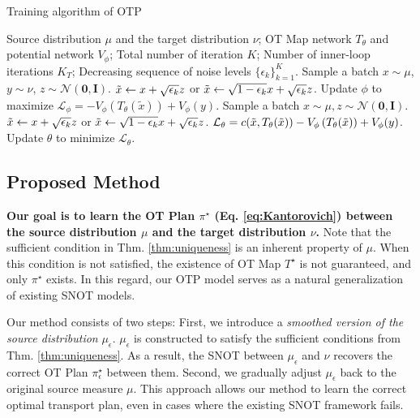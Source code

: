 \begin{algorithm}[t]
\caption{Training algorithm of OTP}
\begin{algorithmic}[1]
\REQUIRE Source distribution $\mu$ and the target distribution $\nu$; OT Map network $T_\theta$ and potential network $V_\phi$; Total number of iteration $K$; Number of inner-loop iterations $K_T$; Decreasing sequence of noise levels $\{\epsilon_k \}^K_{k=1}$.
    \STATE Sample a batch $x\sim \mu$, $y\sim \nu$, $z \sim \mathcal{N}(\mathbf{0}, \mathbf{I})$.
    \STATE $\Tilde{x} \leftarrow x + \sqrt{\epsilon_k} z $ or $\Tilde{x} \leftarrow \sqrt{1-\epsilon_k} x + \sqrt{\epsilon_k} z $.
    \STATE Update $\phi$ to maximize $\mathcal{L}_{\phi} = - V_\phi \left(T_\theta(\tilde x)\right) + V_\phi(y)$.
    \STATE Sample a batch $x\sim \mu, z\sim \mathcal{N}(\mathbf{0}, \mathbf{I})$.
    \STATE $\Tilde{x} \leftarrow x + \sqrt{\epsilon_k} z $ or $\Tilde{x} \leftarrow \sqrt{1-\epsilon_k} x + \sqrt{\epsilon_k} z $.
    \STATE $\mathcal{L}_{\theta} = c(\Tilde{x}, T_\theta(\tilde x)) - V_\phi \left(T_\theta(\tilde x)\right) + V_\phi(y)$.
    \STATE Update $\theta$ to minimize $\mathcal{L}_{\theta}$.
    \ENDFOR
\ENDFOR
\end{algorithmic}
\label{alg:otp}
\end{algorithm}

\subsection{Proposed Method} \label{sec:proposed_method}
\textbf{Our goal is to learn the OT Plan $\pi^{\star}$ (Eq. \ref{eq:Kantorovich}) between the source distribution $\mu$ and the target distribution $\nu$.} Note that the sufficient condition in Thm. \ref{thm:uniqueness} is an inherent property of $\mu$. When this condition is not satisfied, the existence of OT Map $T^{\star}$ is not guaranteed, and only $\pi^{\star}$ exists. In this regard, our OTP model serves as a natural generalization of existing SNOT models.

Our method consists of two steps: First, we introduce a \textit{smoothed version of the source distribution} $\mu_{\epsilon}$. $\mu_{\epsilon}$ is constructed to satisfy the sufficient conditions from Thm. \ref{thm:uniqueness}. As a result, the SNOT between $\mu_{\epsilon}$ and $\nu$ recovers the correct OT Plan $\pi^{\star}_{\epsilon}$ between them. Second, we gradually adjust $\mu_{\epsilon}$ back to the original source measure $\mu$. This approach allows our method to learn the correct optimal transport plan, even in cases where the existing SNOT framework fails.


